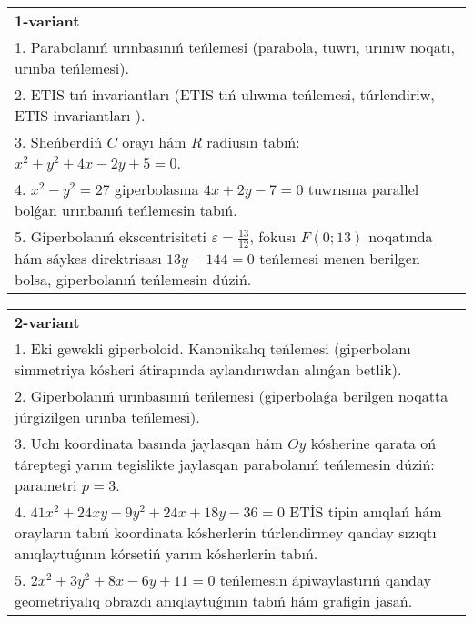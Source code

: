 \documentclass{article}
\begin{document}
\large
{}


\begin{tabular}{m{17cm}}
\textbf{1-variant}\\
1. Parabolanıń urınbasınıń teńlemesi (parabola, tuwrı, urınıw noqatı, urınba teńlemesi).\\

2. ETIS-tıń invariantları (ETIS-tıń ulıwma teńlemesi, túrlendiriw, ETIS invariantları ).\\

3. Sheńberdiń $C$ orayı hám $R$ radiusın tabıń: $x^2+y^2+4 x-2 y+5=0$.\\

4. $x^{2} - y^{2} = 27$ giperbolasına $4x + 2y - 7 = 0$ tuwrısına parallel bolǵan urınbanıń teńlemesin tabıń.  \\

5. Giperbolanıń ekscentrisiteti $\varepsilon = \frac{13}{12}$, fokusı $F(0;13)$ noqatında hám sáykes direktrisası $13y - 144 = 0$ teńlemesi menen berilgen bolsa, giperbolanıń teńlemesin dúziń.  
\end{tabular}
\vspace{1cm}


\begin{tabular}{m{17cm}}
\textbf{2-variant}\\
1. Eki gewekli giperboloid. Kanonikalıq teńlemesi (giperbolanı simmetriya kósheri átirapında aylandırıwdan alınǵan betlik).\\

2. Giperbolanıń urınbasınıń teńlemesi (giperbolaǵa berilgen noqatta júrgizilgen urınba teńlemesi).\\

3. Uchı koordinata basında jaylasqan hám $Oy$ kósherine qarata oń táreptegi yarım tegislikte jaylasqan parabolanıń teńlemesin dúziń: parametri $p=3$.\\

4. $41x^{2} + 24xy + 9y^{2} + 24x + 18y - 36 = 0$ ETİS tipin anıqlań hám orayların tabıń koordinata kósherlerin túrlendirmey qanday sızıqtı anıqlaytuǵının kórsetiń yarım kósherlerin tabıń.  \\

5. $2x^{2} + 3y^{2} + 8x - 6y + 11 = 0$ teńlemesin ápiwaylastırıń qanday geometriyalıq obrazdı anıqlaytuǵının tabıń hám grafigin jasań.  
\end{tabular}
\vspace{1cm}
\end{document}
